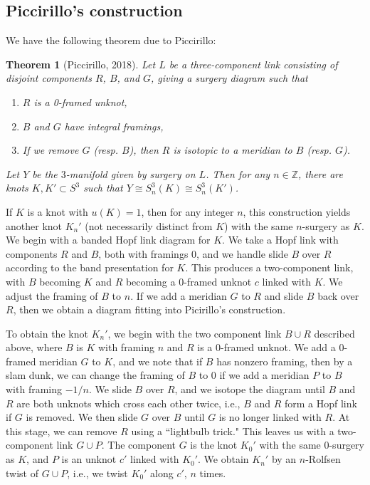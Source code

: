 \documentclass[11pt,usenames,dvipsnames,reqno]{amsart}
\newtheorem{theorem}{Theorem}
\numberwithin{theorem}{section}
\theoremstyle{ex}
\theoremstyle{rem}
\begin{document}
\subsection{Piccirillo's construction} We have the following theorem due to Piccirillo:

\begin{theorem}[Piccirillo, 2018]
	Let $L$ be a three-component link consisting of disjoint components $R$, $B$, and $G$, giving a surgery diagram such that
	\begin{enumerate}[label=\normalfont (\alph*)]
		\item $R$ is a 0-framed unknot,
		\item $B$ and $G$ have integral framings,
		\item If we remove $G$ (resp. $B$), then $R$ is isotopic to a meridian to $B$ (resp. $G$).
	\end{enumerate}
	Let $Y$ be the $3$-manifold given by surgery on $L$. Then for any $n\in\mathbb{Z}$, there are knots $K,K'\subset S^3$ such that $Y\cong S_n^3(K)\cong S_n^3(K')$.

\end{theorem}

If $K$ is a knot with $u(K)=1$, then for any integer $n$, this construction yields another knot $K_n'$ (not necessarily distinct from $K$) with the same $n$-surgery as $K$. We begin with a banded Hopf link diagram for $K$. We take a Hopf link with components $R$ and $B$, both with framings 0, and we handle slide $B$ over $R$ according to the band presentation for $K$. This produces a two-component link, with $B$ becoming $K$ and $R$ becoming a 0-framed unknot $c$ linked with $K$. We adjust the framing of $B$ to $n$. If we add a meridian $G$ to $R$ and slide $B$ back over $R$, then we obtain a diagram fitting into Picirillo's construction.

To obtain the knot $K_n'$, we begin with the two component link $B\cup R$ described above, where $B$ is $K$ with framing $n$ and $R$ is a 0-framed unknot. We add a 0-framed meridian $G$ to $K$, and we note that if $B$ has nonzero framing, then by a slam dunk, we can change the framing of $B$ to 0 if we add a meridian $P$ to $B$ with framing $-1/n$. We slide $B$ over $R$, and we isotope the diagram until $B$ and $R$ are both unknots which cross each other twice, i.e., $B$ and $R$ form a Hopf link if $G$ is removed. We then slide $G$ over $B$ until $G$ is no longer linked with $R$. At this stage, we can remove $R$ using a ``lightbulb trick." This leaves us with a two-component link $G\cup P$. The component $G$ is the knot $K_0'$ with the same 0-surgery as $K$, and $P$ is an unknot $c'$ linked with $K_0'$. We obtain $K_n'$ by an $n$-Rolfsen twist of $G\cup P$, i.e., we twist $K_0'$ along $c'$, $n$ times.
\end{document}
